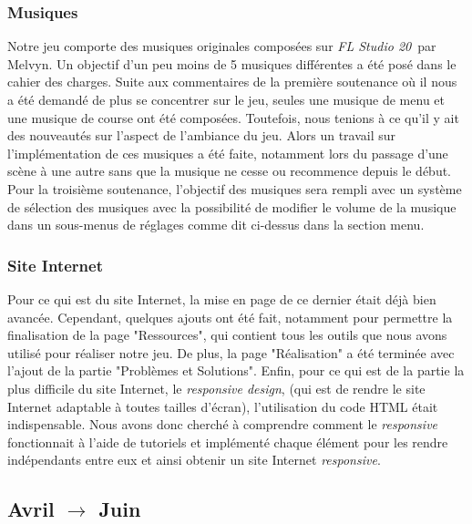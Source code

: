 \documentclass[a4paper,12pt]{article}
\newcommand{\FL}{\textsl{FL Studio 20}}
\begin{document}
            \subsubsection{Musiques}
                Notre jeu comporte des musiques originales composées sur \FL\, par Melvyn. Un objectif d'un 
                peu moins de 5 musiques différentes a été posé dans le cahier des charges. Suite aux 
                commentaires de la première soutenance où il nous a été demandé de plus se concentrer sur le
                jeu, seules une musique de menu et une musique de course ont été composées. Toutefois, nous 
                tenions à ce qu'il y ait des nouveautés sur l'aspect de l'ambiance du jeu. Alors un travail 
                sur l'implémentation de ces musiques a été faite, notamment lors du passage d'une scène à
                une autre sans que la musique ne cesse ou recommence depuis le début. Pour la troisième 
                soutenance, l'objectif des musiques sera rempli avec un système de sélection des musiques 
                avec la possibilité de modifier le volume de la musique dans un sous-menus de réglages comme
                dit ci-dessus dans la section menu.

            \subsubsection{Site Internet}
                Pour ce qui est du site Internet, la mise en page de ce dernier était déjà bien avancée. 
                Cependant, quelques ajouts ont été fait, notamment pour permettre la finalisation de la 
                page "Ressources", qui contient tous les outils que nous avons utilisé pour réaliser notre 
                jeu. De plus, la page "Réalisation" a été terminée avec l'ajout de la partie 
                "Problèmes et Solutions".
                Enfin, pour ce qui est de la partie la plus difficile du site Internet, le \textit{responsive 
                design}, (qui est de rendre le site Internet adaptable à toutes tailles d'écran), l'utilisation 
                du code HTML était indispensable. Nous avons donc cherché à comprendre comment le 
                \textit{responsive} fonctionnait à l'aide de tutoriels et implémenté chaque élément 
                pour les rendre indépendants entre eux et ainsi obtenir un site Internet \textit{responsive}.

        \clearpage
        \subsection{Avril $\to$ Juin}
\end{document}
